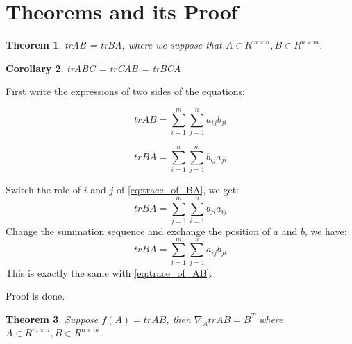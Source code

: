 \documentclass[a4paper]{article}
\newtheorem{theorem}{Theorem}[section]
\newtheorem{corollary}[theorem]{Corollary}
\newenvironment{proof}[1][Proof]{\begin{trivlist}
\item[\hskip \labelsep {\bfseries #1}]}{\end{trivlist}}
\newcommand{\qed}{\nobreak \ifvmode \relax \else
      \ifdim\lastskip<1.5em \hskip-\lastskip
      \hskip1.5em plus0em minus0.5em \fi \nobreak
      \vrule height0.75em width0.5em depth0.25em\fi}
\begin{document}
\section{Theorems and its Proof}

\begin{theorem}
	trAB = trBA, where we suppose that $A \in R^{m \times n}, B \in R^{n
    \times m}$.
\end{theorem}

\begin{corollary}
	trABC = trCAB = trBCA
\end{corollary}

\begin{proof}
	First write the expressions of two sides of the equations:


	\begin{equation}
		trAB = \sum\limits^{m}_{i=1}\sum\limits^{n}_{j=1}a_{ij}b_{ji}
		\label{eq:trace_of_AB}
	\end{equation}

	\begin{equation}
		trBA = \sum\limits^{n}_{i=1}\sum\limits^{m}_{j=1}b_{ij}a_{ji}
		\label{eq:trace_of_BA}
	\end{equation}

	Switch the role of $i$ and $j$ of \cref{eq:trace_of_BA}, we get:
	\begin{displaymath}
		trBA = \sum\limits^{m}_{j=1}\sum\limits^{n}_{i=1}b_{ji}a_{ij}
	\end{displaymath}
	Change the summation sequence and exchange the position of $a$ and
	$b$, we have:
	\begin{displaymath}
		trBA = \sum\limits^{m}_{i=1}\sum\limits^{n}_{j=1}a_{ij}b_{ji}
	\end{displaymath}
	This is exactly the same with \cref{eq:trace_of_AB}.

	Proof is done.\qed
\end{proof}

\begin{theorem}
	Suppose $f(A) = trAB$, then $\nabla_A trAB = B^T$ where $A \in R^{m
    \times n}, B \in R^{n \times m}$.
	\label{thm:trAB_=_B^T}
\end{theorem}
\end{document}
